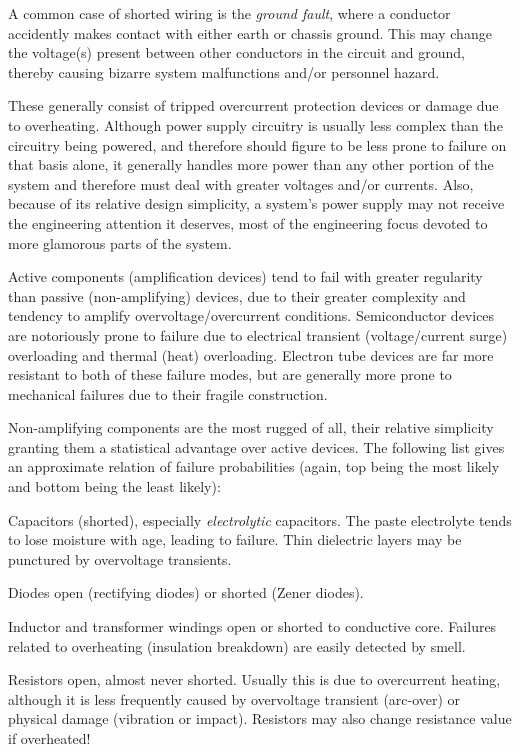A common case of shorted wiring is the {\em ground fault}, where a
conductor accidently makes contact with either earth or chassis ground.
This may change the voltage(s) present between other conductors in the
circuit and ground, thereby causing bizarre system malfunctions and/or
personnel hazard.

\stopsubsection

\startsubsection[title={Power Supply
Problems},reference={sec:xtocid157909716}]

These generally consist of tripped overcurrent protection devices or
damage due to overheating. Although power supply circuitry is usually
less complex than the circuitry being powered, and therefore should
figure to be less prone to failure on that basis alone, it generally
handles more power than any other portion of the system and therefore
must deal with greater voltages and/or currents. Also, because of its
relative design simplicity, a system's power supply may not receive the
engineering attention it deserves, most of the engineering focus devoted
to more glamorous parts of the system.

\stopsubsection

\startsubsection[title={Active
Components},reference={sec:xtocid157909717}]

Active components (amplification devices) tend to fail with greater
regularity than passive (non-amplifying) devices, due to their greater
complexity and tendency to amplify overvoltage/overcurrent conditions.
Semiconductor devices are notoriously prone to failure due to electrical
transient (voltage/current surge) overloading and thermal (heat)
overloading. Electron tube devices are far more resistant to both of
these failure modes, but are generally more prone to mechanical failures
due to their fragile construction.

\stopsubsection

\startsubsection[title={Passive
Components},reference={sec:xtocid157909718}]

Non-amplifying components are the most rugged of all, their relative
simplicity granting them a statistical advantage over active devices.
The following list gives an approximate relation of failure
probabilities (again, top being the most likely and bottom being the
least likely):

\startitemize[packed]
\item
  Capacitors (shorted), especially {\em electrolytic} capacitors. The
  paste electrolyte tends to lose moisture with age, leading to failure.
  Thin dielectric layers may be punctured by overvoltage transients.
\item
  Diodes open (rectifying diodes) or shorted (Zener diodes).
\item
  Inductor and transformer windings open or shorted to conductive core.
  Failures related to overheating (insulation breakdown) are easily
  detected by smell.
\item
  Resistors open, almost never shorted. Usually this is due to
  overcurrent heating, although it is less frequently caused by
  overvoltage transient (arc-over) or physical damage (vibration or
  impact). Resistors may also change resistance value if overheated!
\stopitemize

